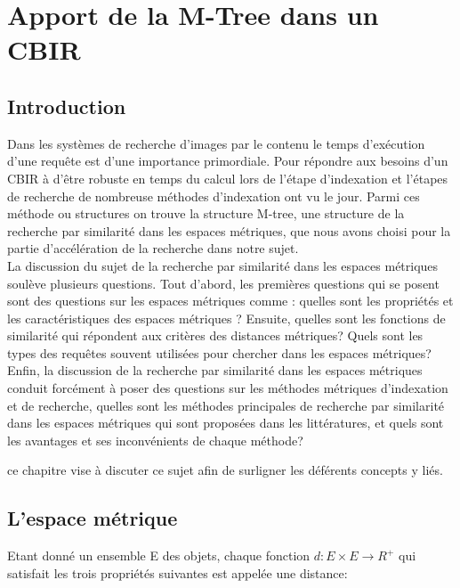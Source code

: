 
\chapter{Apport de la M-Tree dans un CBIR} %

\label{ChapterX} %


\section{Introduction}
Dans les systèmes de recherche d'images par le contenu le temps d'exécution d'une requête est d'une importance primordiale. Pour répondre aux besoins d'un CBIR à d'être robuste en temps du calcul lors de l'étape d'indexation et l'étapes de recherche de nombreuse méthodes d'indexation ont vu le jour. Parmi ces méthode ou structures on trouve la structure M-tree, une structure de la recherche par similarité dans les espaces métriques, que nous avons choisi pour la partie d'accélération de la recherche dans notre sujet. \\
 
La discussion du sujet de la recherche par similarité dans les espaces métriques soulève plusieurs questions. Tout d’abord, les premières questions qui se posent sont des questions sur les espaces métriques comme : quelles sont les propriétés et les caractéristiques des espaces
métriques ? Ensuite, quelles sont les fonctions de similarité qui répondent aux critères des distances métriques? Quels sont les types des requêtes souvent utilisées pour chercher dans les espaces métriques?\\

Enfin, la discussion de la recherche par similarité dans les espaces métriques conduit forcément à poser des questions sur les méthodes métriques d’indexation et de recherche, quelles sont les méthodes principales de recherche par similarité dans les espaces métriques
qui sont proposées dans les littératures, et quels sont les avantages et ses inconvénients de chaque méthode?

ce chapitre vise à discuter ce sujet afin de surligner les déférents concepts y liés.
\section{L’espace métrique}
Etant donné un ensemble E des objets, chaque fonction $d: E\times E\rightarrow R^+$ qui satisfait les trois propriétés suivantes est appelée une distance:

